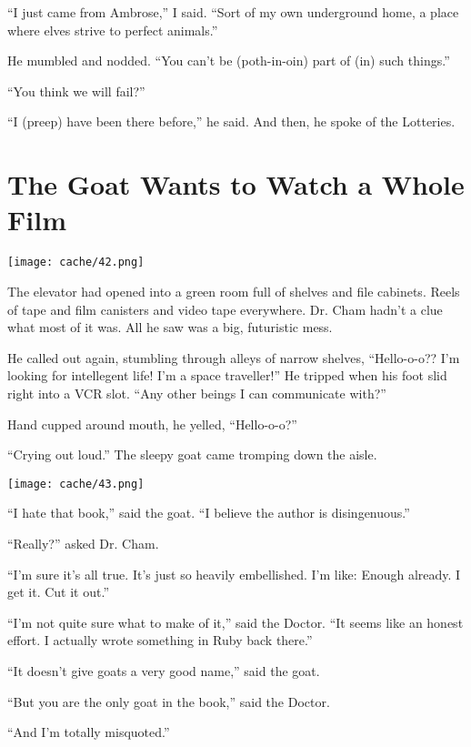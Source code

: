 \documentclass[12pt,twoside]{report}
\begin{document}
``I just came from Ambrose,'' I said.  ``Sort of my own underground
home, a place where elves strive to perfect animals.''

He mumbled and nodded.  ``You can't be (poth-in-oin) part of (in) such
things.''

``You think we will fail?''

``I (preep) have been there before,'' he said.  And then, he spoke of
the Lotteries.

\newpage


\section{The Goat Wants to Watch a Whole Film}



	\texttt{[image: cache/42.png]}

The elevator had opened into a green room full of shelves and file
cabinets.  Reels of tape and film canisters and video tape everywhere.
Dr. Cham hadn't a clue what most of it was.  All he saw was a big,
futuristic mess.

He called out again, stumbling through alleys of narrow shelves,
``Hello-o-o??  I'm looking for intellegent life!  I'm a space
traveller!''  He tripped when his foot slid right into a VCR
slot. ``Any other beings I can communicate with?''

Hand cupped around mouth, he yelled, ``Hello-o-o?''

``Crying out loud.''  The sleepy goat came tromping down the aisle.

\newpage


	\texttt{[image: cache/43.png]}

``I hate that book,'' said the goat.  ``I believe the author is
        disingenuous.''

``Really?'' asked Dr. Cham.

``I'm sure it's all true.  It's just so heavily embellished.  I'm
        like: Enough already.  I get it.  Cut it out.''

``I'm not quite sure what to make of it,'' said the Doctor.  ``It
        seems like an honest effort. I actually wrote something in
        Ruby back there.''

``It doesn't give goats a very good name,'' said the goat.

``But you are the only goat in the book,'' said the Doctor.

``And I'm totally misquoted.''
\end{document}
